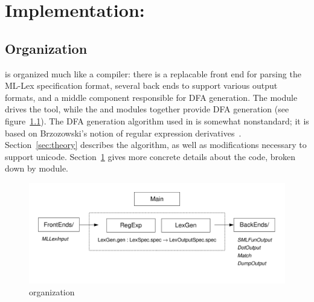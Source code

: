\chapter[\ulex]{Implementation: \ulex}\label{sec:code}

\section{Organization}


\ulex{} is organized much like a compiler: there is a replacable front end for
parsing the ML-Lex specification format, several back ends to support various
output formats, and a middle component responsible for DFA generation.  The
 module drives the tool, while the  and  modules
together provide DFA generation (see figure~\ref{fig:ml-flex}).  The DFA
generation algorithm used in \ulex{} is somewhat nonstandard; it is based on
Brzozowski's notion of regular expression derivatives~\cite{derivatives}. 
Section~\ref{sec:theory} describes the algorithm, as well as modifications
necessary to support unicode.  Section~\ref{sec:code} gives more concrete
details about the code, broken down by module.

\begin{figure}\label{fig:ml-flex}
\begin{center}
\ifpdf
  \includegraphics[scale=0.8]{impl-pic.pdf}
\fi
\end{center}
\caption{\ulex{} organization}
\end{figure}

\section{}\label{sec:reg-exp}


